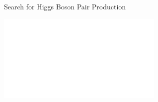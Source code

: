 \documentclass[11pt, xcolor={dvipsnames}, aspectratio=169, notes]{beamer}
\begin{document}

\begin{frame}[standout]
  Search for Higgs Boson Pair Production

  \vspace*{1.5em}

  \includegraphics[width=0.6\textwidth]{final_state/final_state_hadhad_inverted}
\end{frame}

\end{document}
